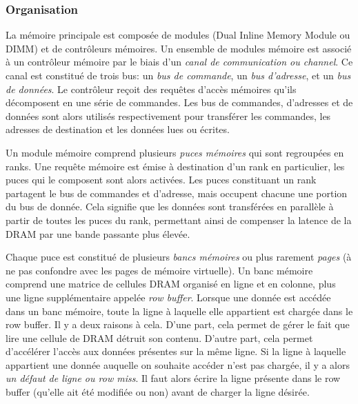 \subsubsection{Organisation}

La mémoire principale est composée de modules (Dual Inline Memory Module ou DIMM) et de contrôleurs mémoires.
Un ensemble de modules mémoire est associé à un contrôleur mémoire par le biais d'un \emph{canal de communication ou channel}.
Ce canal est constitué de trois bus: un \emph{bus de commande}, un \emph{bus d'adresse}, et un \emph{bus de données}.
Le contrôleur reçoit des requêtes d'accès mémoires qu'ils décomposent en une série de commandes.
Les bus de commandes, d'adresses et de données sont alors utilisés respectivement pour transférer les commandes, les adresses de destination et les données lues ou écrites.

Un module mémoire comprend plusieurs \emph{puces mémoires} qui sont regroupées en ranks.
Une requête mémoire est émise à destination d'un rank en particulier, les puces qui le composent sont alors activées.
Les puces constituant un rank partagent le bus de commandes et d'adresse, mais occupent chacune une portion du bus de donnée.
Cela signifie que les données sont transférées en parallèle à partir de toutes les puces du rank, permettant ainsi de compenser la latence de la DRAM par une bande passante plus élevée.

Chaque puce est constitué de plusieurs \emph{bancs mémoires} ou plus rarement \emph{pages} (à ne pas confondre avec les pages de mémoire virtuelle).
Un banc mémoire comprend une matrice de cellules DRAM organisé en ligne et en colonne, plus une ligne supplémentaire appelée \emph{row buffer}.
Lorsque une donnée est accédée dans un banc mémoire, toute la ligne à laquelle elle appartient est chargée dans le row buffer.
Il y a deux raisons à cela.
D'une part, cela permet de gérer le fait que lire une cellule de DRAM détruit son contenu.
D'autre part, cela permet d'accélérer l'accès aux données présentes sur la même ligne.
Si la ligne à laquelle appartient une donnée auquelle on souhaite accéder n'est pas chargée, il y a alors \emph{un défaut de ligne ou row miss}.
Il faut alors écrire la ligne présente dans le row buffer (qu'elle ait été modifiée ou non) avant de charger la ligne désirée.

